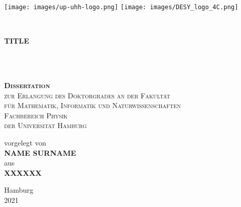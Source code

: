
\begin{titlepage} %

\vspace*{-4cm}
\hspace*{-1.5cm}
\texttt{[image: images/up-uhh-logo.png]}
\hfill
\texttt{[image: images/DESY\_logo\_4C.png]}

\vspace{2cm}
    \centering

	\noindent\makebox[\linewidth]{\rule{1.05\textwidth}{1.5pt}} \\
	\vspace{0.4cm}
    \parbox[t]{0.96\textwidth}{\rmfamily \setlength\parfillskip{0pt} \def\baselinestretch{1.1}\centering\Huge \bfseries TITLE}\\
	\vspace{0.4cm}
	\noindent\makebox[\linewidth]{\rule{1.05\textwidth}{1.5pt}} \\
    \vspace{2 cm} %
	
	
    \parbox[p]{0.95\textwidth}{\def\baselinestretch{1.4}\centering\scshape\textbf{\LARGE Dissertation} \\ {\large zur Erlangung des Doktorgrades an der Fakult{\"a}t\\ f{\"u}r Mathematik, Informatik und Naturwissenschaften \\ Fachbereich Physik \\ der Universit{\"a}t Hamburg} }
    
    \vspace{2 cm} %

    \parbox[b]{0.93\textwidth}{\def\baselinestretch{1.3}\centering\upshape \Large vorgelegt von \\ {\LARGE\scshape \bfseries NAME SURNAME } \\ aus \\ {\scshape \bfseries XXXXXX}}
    
    \vspace{2 cm} %
    
    \parbox[b]{0.93\textwidth}{\def\baselinestretch{1.3}\centering\upshape\large Hamburg\\ 2021}

\end{titlepage}

